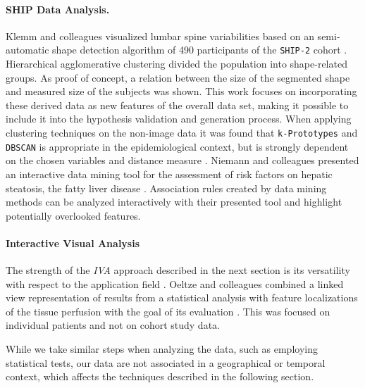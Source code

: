 \documentclass[journal]{style/vgtc} 			          %
\begin{document}
\paragraph{SHIP Data Analysis.}
Klemm and colleagues visualized lumbar spine variabilities based on an semi-automatic shape detection algorithm of 490 participants of the \texttt{SHIP-2} cohort \cite{Klemm2013VMV}.
%
Hierarchical agglomerative clustering divided the population into shape-related groups.
%
As proof of concept, a relation between the size of the segmented shape and measured size of the subjects was shown.
%
This work focuses on incorporating these derived data as new features of the overall data set, making it possible to include it into the hypothesis validation and generation process.
%
When applying clustering techniques on the non-image data it was found that \texttt{k-Prototypes} and \texttt{DBSCAN} is appropriate in the epidemiological context, but is strongly dependent on the chosen variables and distance measure \cite{Klemm2014BVM}.
%
Niemann and colleagues presented an interactive data mining tool for the assessment of risk factors on hepatic steatosis, the fatty liver disease \cite{Niemann2014}.
%
Association rules created by data mining methods can be analyzed interactively with their presented tool and highlight potentially overlooked features.

\paragraph{Interactive Visual Analysis}
The strength of the \emph{IVA} approach described in the next section is its versatility with respect to the application field \cite{Konyha2009}.
%
Oeltze and colleagues combined a linked view representation of results from a statistical analysis with feature localizations of the tissue perfusion with the goal of its evaluation \cite{Oeltze2007}.
%
This was focused on individual patients and not on cohort study data. 
%

While we take similar steps when analyzing the data, such as employing statistical tests, our data are not associated in a geographical or temporal context, which affects the techniques described in the following section.
\end{document}
